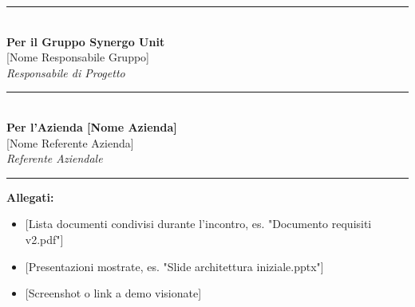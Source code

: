 \vspace{2.5cm}

\noindent
\begin{minipage}[c]{0.45\textwidth}
	\begin{center}
		\rule{6cm}{0.4pt} \\ 
		\vspace{0.2cm}
		\textbf{Per il Gruppo Synergo Unit} \\
		{[Nome Responsabile Gruppo]} \\
		\textit{Responsabile di Progetto}
	\end{center}
\end{minipage}
\hfill
\begin{minipage}[c]{0.45\textwidth}
	\begin{center}
		\rule{6cm}{0.4pt} \\ 
		\vspace{0.2cm}
		\textbf{Per l'Azienda {[Nome Azienda]}} \\
		{[Nome Referente Azienda]} \\
		\textit{Referente Aziendale}
	\end{center}
\end{minipage}

\vspace{2cm}

\rule{\textwidth}{0.4pt}
\vspace{0.1cm}
\textbf{Allegati:}
\begin{itemize}
	\item {[Lista documenti condivisi durante l'incontro, es. "Documento requisiti v2.pdf"]}
	\item {[Presentazioni mostrate, es. "Slide architettura iniziale.pptx"]}
	\item {[Screenshot o link a demo visionate]}
\end{itemize}
